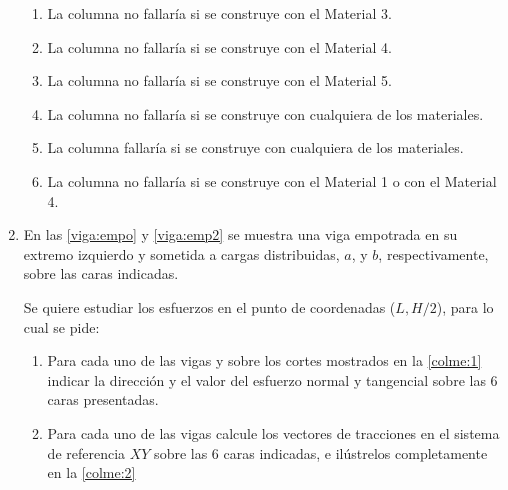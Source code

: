 \documentclass[../notas medios.tex]{subfiles}
\begin{document}
\begin{enumerate}
\begin{enumerate}
	\item La columna no fallar\'ia si se construye con el Material 3.
	\item La columna no fallar\'ia si se construye con el Material 4.
	\item La columna no fallar\'ia si se construye con el Material 5.
	\item La columna no fallar\'ia si se construye con cualquiera de los materiales.
	\item La columna fallar\'ia si se construye con cualquiera de los materiales.
	\item La columna no fallar\'ia si se construye con el Material 1 o con el Material 4.
\end {enumerate}	
%
\item \label{punto17} En las \cref{viga:empo} y  \cref{viga:emp2}  se
muestra una viga empotrada en su extremo izquierdo y sometida a cargas distribuidas, $a$,  y $b$, respectivamente, sobre las caras indicadas.\\
%
\begin{figure}[H]
	\centering
		\hspace{2.0cm}
	\caption{ }
\end{figure}
%
Se quiere estudiar los esfuerzos en el punto de coordenadas ($L,H/2$), para lo cual se pide:

\begin{enumerate}
	\item Para cada uno de las vigas y sobre los cortes mostrados en la \cref{colme:1} indicar la direcci\'on y el valor del esfuerzo normal y tangencial sobre las 6 caras presentadas. 
	\item Para cada uno de las vigas calcule los vectores de tracciones en el sistema de referencia $ X Y$ sobre las 6 caras indicadas, e il\'ustrelos completamente en la \cref{colme:2}
\end{enumerate}

\begin{figure}[H]
	\centering
		\hspace{2.0cm}
	\caption{ }
\end{figure}


\end{enumerate}
\end{document}
